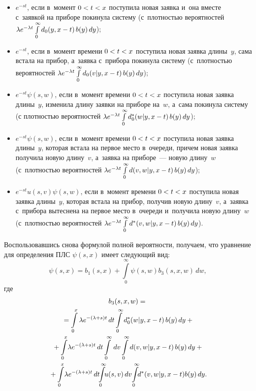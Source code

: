 \begin{multicols}{2}
\begin{itemize}
\item  $e^{-s t}$, если в~момент $0\hm<t\hm<x$
поступила новая заявка и~она вместе с~заявкой на приборе покинула
систему (с~плот\-ностью вероятностей
$\lambda e^{-\lambda t} \int\limits_0^\infty d_0(y,x-t)\,b(y)\,dy
$);

\item  $e^{-s t}$, если в~момент времени
$0\hm<t\hm<x$ поступила новая заявка длины~$y$, сама встала на прибор, а~заявка с~прибора покинула систему (с~плот\-ностью вероятностей
$\la e^{-\la t} \int\limits_0^\infty d_0(v|y,x\hm-t)\, b(y)\, dy
$);

\item  $e^{-s t}\psi(s,w)$, если в~момент времени
$0\hm<t\hm<x$ поступила новая заявка длины~$y$,
изменила длину заявки на приборе на~$w$, а~сама покинула систему (с плотностью вероятностей $\lambda e^{-\lambda t} \int\limits_0^\infty d^*_0(w|y,x-t)\, b(y)\, dy
$);

\item  $e^{-s t}\psi(s,w)$, если в~момент
времени $0\hm<t\hm<x$ поступила новая заявка длины~$y$, которая встала на первое место в~очереди, причем новая заявка получила новую длину~$v$, а~заявка на приборе~--- новую длину~$w$ (с~плот\-ностью вероятностей $\lambda e^{-\lambda t}
\int\limits_0^\infty d(v,w|y,x-t)\, b(y)\, dy
$);

\item  $e^{-s t}u(s,v)\psi(s,w)$, если в~момент
времени $0\hm<t\hm<x$ поступила новая заявка длины~$y$, которая встала на прибор, получив новую длину~$v$, а~заявка с~прибора вытеснена на первое место в~очереди и~получила новую длину~$w$ (с~плот\-ностью вероятностей
$\lambda e^{-\lambda t} \int\limits_0^\infty d^*(v,w|y,x-t)\, b(y)\, dy
$).
\end{itemize}

Воспользовавшись снова формулой полной вероятности, получаем, что
уравнение для определения ПЛС $\psi(s,x)$ имеет следующий вид:
\begin{equation}
\label{eq3}
\psi(s,x)= b_1(s,x)+\int\limits_0^\infty\psi(s,w) b_3(s,x,w) \, dw,
\end{equation}
где
\begin{multline*}
b_3(s,x,w) = {}\\
{}=\int\limits_0^x \la e^{-(\la+s) t}\,dt
\int\limits_0^\infty d^*_0(w|y,x-t)\, b(y)\, dy
+{}\\
{}+
\int\limits_0^x \!\la e^{-(\la+s) t}\,dt
\int\limits_0^\infty \, dv
\int\limits_0^\infty d(v,w|y,x-t)\, b(y)\, dy
+{}\\
{}+
\int\limits_0^x\! \la e^{-(\la+s) t}\,dt\!\!
\int\limits_0^\infty\! \!u(s,v)\, dv\!
\int\limits_0^\infty\!\! d^*(v,w|y,x-t) b(y)\, dy.
\end{multline*}


\end{multicols}
